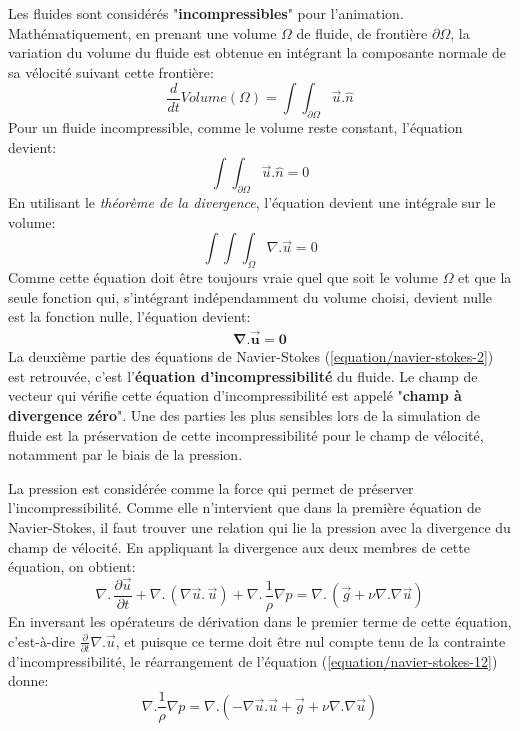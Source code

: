 \documentclass[11pt]{article}
\begin{document}
Les fluides sont considérés "\textbf{incompressibles}" pour l'animation. Mathématiquement, en prenant une volume $ \Omega $ de fluide, de frontière $ \partial\Omega $, la variation du volume du fluide est obtenue en intégrant la composante normale de sa vélocité suivant cette frontière:
	\begin{equation}
	\frac{d}{dt} Volume(\Omega) = \int \!\!\!\! \int_{\partial \Omega} \overrightarrow{u} . \hat{n}
	\end{equation}
Pour un fluide incompressible, comme le volume reste constant, l'équation devient:
	\begin{equation}
	\int \!\!\!\! \int_{\partial \Omega} \overrightarrow{u} . \hat{n} = 0
	\end{equation}
En utilisant le \textit{théorème de la divergence}, l'équation devient une intégrale sur le volume:
	\begin{equation}
	\int \!\!\!\! \int \!\!\!\! \int_{\Omega} \nabla . \overrightarrow{u} = 0
	\end{equation}
Comme cette équation doit être toujours vraie quel que soit le volume $ \Omega $ et que la seule fonction qui, s'intégrant indépendamment du volume choisi, devient nulle est la fonction nulle, l'équation devient:
	\begin{eqnarray*}
	\mathbf{\nabla . \overrightarrow{u} = 0}
	\end{eqnarray*}
La deuxième partie des équations de Navier-Stokes (\ref{equation/navier-stokes-2}) est retrouvée, c'est l'\textbf{équation d'incompressibilité} du fluide. Le champ de vecteur qui vérifie cette équation d'incompressibilité est appelé  "\textbf{champ à divergence zéro}". Une des parties les plus sensibles lors de la simulation de fluide est la préservation de cette incompressibilité pour le champ de vélocité, notamment par le biais de la pression.

La pression est considérée comme la force qui permet de préserver l'incompressibilité. Comme elle n'intervient que dans la première équation de Navier-Stokes, il faut trouver une relation qui lie la pression avec la divergence du champ de vélocité. En appliquant la divergence aux deux membres de cette équation, on obtient:
	\begin{equation}\label{equation/navier-stokes-12}
	\nabla . \, \frac{\partial \overrightarrow{u}}{\partial t} + \nabla . \, (\nabla \overrightarrow{u}. \,  \overrightarrow{u}) + \nabla . \, \frac{1}{\rho} \nabla p  =  \nabla . \, (\overrightarrow{g} + \nu \nabla . \nabla \overrightarrow{u})
	\end{equation}
En inversant les opérateurs de dérivation dans le premier terme de cette équation, c'est-à-dire $\frac{\partial }{\partial t}\nabla .\overrightarrow{u}$, et puisque ce terme doit être nul compte tenu de la contrainte d'incompressibilité, le réarrangement de l'équation (\ref{equation/navier-stokes-12}) donne:
	\begin{equation}
	\nabla . \frac{1}{\rho}\nabla p = \nabla . (-\nabla \overrightarrow{u} . \overrightarrow{u}+ \overrightarrow{g} + \nu \nabla . \nabla 	\overrightarrow{u}) 
	\end{equation}
\end{document}
